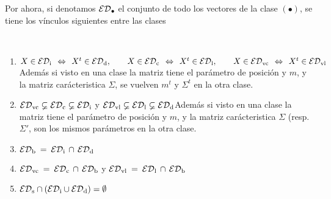 Por ahora,  si denotamos $\mathcal{ED}_\bullet$  el conjunto de  todo los vectores  de la
clase $(\bullet)$, se tiene los v\'inculos siguientes entre las clases
%
\begin{lema}

  \

  \begin{enumerate}
  \item\label{Enum:MP:EDM_Transpuesta} $X \in \mathcal{ED}_{\mathrm{i}} \:\: \Leftrightarrow \:\:
    X^t \in  \mathcal{ED}_{\mathrm{d}}, \qquad X \in  \mathcal{ED}_{\mathrm{c}} \:\: \Leftrightarrow  \:\: X^t \in
    \mathcal{ED}_{\mathrm{l}},  \qquad  X  \in   \mathcal{ED}_{\mathrm{vc}}  \:\:  \Leftrightarrow  \:\:  X^t  \in
    \mathcal{ED}_{\mathrm{vl}}$\newline  Adem\'as si  visto  en  una clase  la  matriz tiene  el
    par\'ametro de posici\'on  y $m$, y la matriz  car\'acteristica $\Sigma$, se
    vuelven $m^t$ y $\Sigma^t$ en la otra clase.
  \item\label{Enum:MP:EDM_Inclusiones}    $\mathcal{ED}_{\mathrm{vc}}    \varsubsetneq   \mathcal{ED}_{\mathrm{c}}
    \varsubsetneq  \mathcal{ED}_{\mathrm{i}}$ \qquad y  \qquad $\mathcal{ED}_{\mathrm{vl}}  \varsubsetneq \mathcal{ED}_{\mathrm{l}}
    \varsubsetneq \mathcal{ED}_{\mathrm{d}}$\newline  Adem\'as si visto  en una clase  la matriz
    tiene  el par\'ametro  de posici\'on  y  $m$, y  la matriz  car\'acteristica
    $\Sigma$ (resp. $\Sigma'$, son los mismos par\'ametros en la otra clase.
  \item\label{Enum:MP:EDM_Bilateral}  $\mathcal{ED}_{\mathrm{b}}  \: =  \:  \mathcal{ED}_{\mathrm{i}}  \, \cap  \,
    \mathcal{ED}_{\mathrm{d}}$
  \item\label{Enum:MP:EDM_VcBilateral} $\mathcal{ED}_{\mathrm{vc}}  \: =  \: \mathcal{ED}_{\mathrm{c}} \,  \cap \,
    \mathcal{ED}_{\mathrm{b}}$ \qquad y \qquad $\mathcal{ED}_{\mathrm{vl}} \: = \: \mathcal{ED}_{\mathrm{l}} \, \cap \, \mathcal{ED}_{\mathrm{b}}$
  \item\label{Enum:MP:EDM_Simetrica}  $\mathcal{ED}_{\mathrm{s}}   \cap  \left(  \mathcal{ED}_{\mathrm{i}}  \cup
      \mathcal{ED}_{\mathrm{d}} \right) = \emptyset$
  \end{enumerate}
\end{lema}
%
